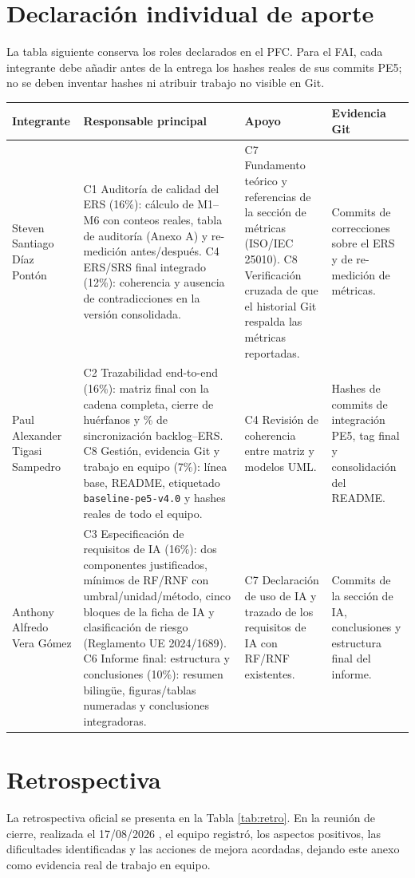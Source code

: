 \documentclass[11pt,a4paper]{article}
\begin{document}
\begin{appendices}
	\section{Declaración individual de aporte}
	La tabla siguiente conserva los roles declarados en el PFC. Para el FAI, cada integrante debe añadir antes de la entrega los hashes reales de sus commits PE5; no se deben inventar hashes ni atribuir trabajo no visible en Git.
	\begin{longtable}{p{3.6cm}p{4.6cm}p{4.6cm}p{2.8cm}}\toprule\textbf{Integrante}&\textbf{Responsable principal}&\textbf{Apoyo}&\textbf{Evidencia Git}\\\midrule\endhead
		Steven Santiago Díaz Pontón&C1 Auditoría de calidad del ERS (16\%): cálculo de M1--M6 con conteos reales, tabla de auditoría (Anexo A) y re-medición antes/después. C4 ERS/SRS final integrado (12\%): coherencia y ausencia de contradicciones en la versión consolidada.&C7 Fundamento teórico y referencias de la sección de métricas (ISO/IEC 25010). C8 Verificación cruzada de que el historial Git respalda las métricas reportadas.&Commits de correcciones sobre el ERS y de re-medición de métricas.\\
		Paul Alexander Tigasi Sampedro&C2 Trazabilidad end-to-end (16\%): matriz final con la cadena completa, cierre de huérfanos y \% de sincronización backlog--ERS. C8 Gestión, evidencia Git y trabajo en equipo (7\%): línea base, README, etiquetado \texttt{baseline-pe5-v4.0} y hashes reales de todo el equipo.&C4 Revisión de coherencia entre matriz y modelos UML.&Hashes de commits de integración PE5, tag final y consolidación del README.\\
		Anthony Alfredo Vera Gómez&C3 Especificación de requisitos de IA (16\%): dos componentes justificados, mínimos de RF/RNF con umbral/unidad/método, cinco bloques de la ficha de IA y clasificación de riesgo (Reglamento UE 2024/1689). C6 Informe final: estructura y conclusiones (10\%): resumen bilingüe, figuras/tablas numeradas y conclusiones integradoras.&C7 Declaración de uso de IA y trazado de los requisitos de IA con RF/RNF existentes.&Commits de la sección de IA, conclusiones y estructura final del informe.\\\bottomrule\end{longtable}

	
	\section{Retrospectiva}
	La retrospectiva oficial se presenta en la Tabla \ref{tab:retro}. En la reunión de cierre, realizada el 17/08/2026 , el equipo registró, los aspectos positivos, las dificultades identificadas y las acciones de mejora acordadas, dejando este anexo como evidencia real de trabajo en equipo.
	

\end{appendices}
\end{document}
